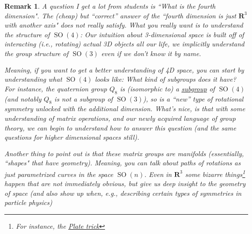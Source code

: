 \documentclass[12pt]{article}
\numberwithin{equation}{subsection}
\theoremstyle{note}
\newtheorem{remark}[subsection]{Remark}
\newcommand{\SO}{\operatorname{SO}}
\begin{document}
\begin{remark} A question I get a lot from students is ``What is the fourth dimension". The (cheap) but ``correct'' answer of the ``fourth dimension is just $\mathbf{R}^3$ with another axis" does not really satisfy. What you really want is to understand the structure of $\SO(4)$: Our intuition about 3-dimensional space is built off of interacting (i.e., rotating) actual 3D objects all our life, we implicitly understand the group structure of $\SO(3)$ even if we don't know it by name. 

Meaning, if you want to get a better understanding of 4D space, you can start by understanding what $\SO(4)$ looks like: What kind of subgroups does it have? For instance, the quaternion group $Q_8$ is (isomorphic to) a \href{https://groupprops.subwiki.org/wiki/Linear_representation_theory_of_quaternion_group#Four-dimensional_irreducible_representation_over_a_non-splitting_field}{subgroup} of $\SO(4)$ (and notably $Q_8$ is not a subgroup of $\SO(3)$), so is a ``new'' type of rotational symmetry unlocked with the additional dimension.  What's nice, is that with some understanding of matrix operations, and our newly acquired language of group theory, we can begin to understand how to answer this question (and the same questions for higher dimensional spaces still). 

Another thing to point out is that these matrix groups are \textit{manifolds} (essentially, ``shapes" that have geometry). Meaning, you can talk about \textit{paths of rotations} as just parametrized curves in the space $\SO(n)$. Even in $\mathbf{R}^3$ some bizarre things\footnote{For instance, the \href{https://en.wikipedia.org/wiki/Plate_trick}{Plate trick}} happen that are not immediately obvious, but give us deep insight to the geometry of space (and also show up when, e.g., describing certain types of symmetries in particle physics) 
\end{remark}
\end{document}
